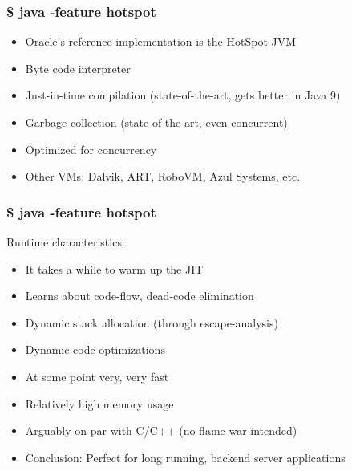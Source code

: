\begin{frame}
  \frametitle{\$ java -feature hotspot}
  \begin{itemize}
    \item Oracle's reference implementation is the HotSpot JVM
    \vspace{0.3cm}
    \item Byte code interpreter
    \vspace{0.3cm}    
    \item Just-in-time compilation	(state-of-the-art, gets better in Java 9)
    \vspace{0.3cm}    
    \item Garbage-collection		(state-of-the-art, even concurrent)    
    \vspace{0.3cm}    
    \item Optimized for concurrency
    \vspace{0.3cm}    
    \item Other VMs: Dalvik, ART, RoboVM, Azul Systems, etc.
  \end{itemize}
\end{frame}

\begin{frame}
  \frametitle{\$ java -feature hotspot}

  Runtime characteristics:
  \vspace{0.25cm}    
  \begin{itemize}
    \item It takes a while to warm up the JIT
    \vspace{0.3cm}    
    \item Learns about code-flow, dead-code elimination
    \vspace{0.3cm}    
    \item Dynamic stack allocation (through escape-analysis)
    \vspace{0.3cm}    
    \item Dynamic code optimizations
    \vspace{0.3cm}
    \item At some point very, very fast
    \vspace{0.3cm}
    \item Relatively high memory usage
    \vspace{0.3cm}
    \item Arguably on-par with C/C++ (no flame-war intended)
    \vspace{0.3cm}
    \item Conclusion: Perfect for long running, backend server applications
  \end{itemize}
\end{frame}